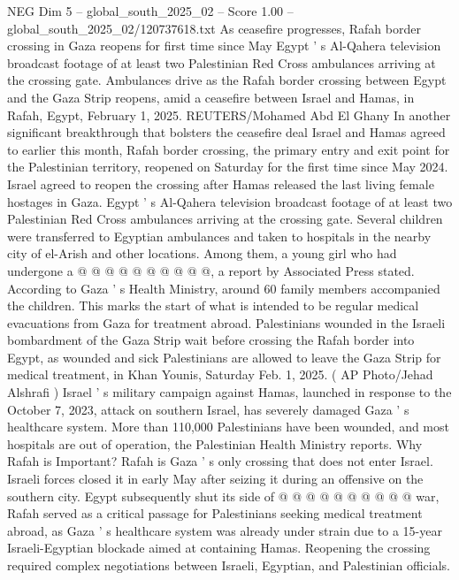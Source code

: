 \begin{textsample}{NEG Dim 5 – global\_south\_2025\_02 – Score 1.00 – global\_south\_2025\_02/120737618.txt}  \label{ex:f5_neg_305}
As ceasefire progresses, Rafah border crossing in Gaza reopens for first time since May Egypt ' s Al-Qahera television broadcast footage of at least two Palestinian Red Cross ambulances arriving at the crossing gate.
Ambulances drive as the Rafah border crossing between Egypt and the Gaza Strip reopens, amid a ceasefire between Israel and Hamas, in Rafah, Egypt, February 1, 2025.
REUTERS/Mohamed Abd El Ghany In another significant breakthrough that bolsters the ceasefire deal Israel and Hamas agreed to earlier this month, Rafah border crossing, the primary entry and exit point for the Palestinian territory, reopened on Saturday for the first time since May 2024.
Israel agreed to reopen the crossing after Hamas released the last living female hostages in Gaza.
Egypt ' s Al-Qahera television broadcast footage of at least two Palestinian Red Cross ambulances arriving at the crossing gate.
Several children were transferred to Egyptian ambulances and taken to hospitals in the nearby city of el-Arish and other locations.
Among them, a young girl who had undergone a @ @ @ @ @ @ @ @ @ @, a report by Associated Press stated.
According to Gaza ' s Health Ministry, around 60 family members accompanied the children.
This marks the start of what is intended to be regular medical evacuations from Gaza for treatment abroad.
Palestinians wounded in the Israeli bombardment of the Gaza Strip wait before crossing the Rafah border into Egypt, as wounded and sick Palestinians are allowed to leave the Gaza Strip for medical treatment, in Khan Younis, Saturday Feb. 1, 2025. ( AP Photo/Jehad Alshrafi ) Israel ' s military campaign against Hamas, launched in response to the October 7, 2023, attack on southern Israel, has severely damaged Gaza ' s healthcare system.
More than 110,000 Palestinians have been wounded, and most hospitals are out of operation, the Palestinian Health Ministry reports.
Why Rafah is Important?
Rafah is Gaza ' s only crossing that does not enter Israel.
Israeli forces closed it in early May after seizing it during an offensive on the southern city.
Egypt subsequently shut its side of @ @ @ @ @ @ @ @ @ @ war, Rafah served as a critical passage for Palestinians seeking medical treatment abroad, as Gaza ' s healthcare system was already under strain due to a 15-year Israeli-Egyptian blockade aimed at containing Hamas.
Reopening the crossing required complex negotiations between Israeli, Egyptian, and Palestinian officials.

\end{textsample}
